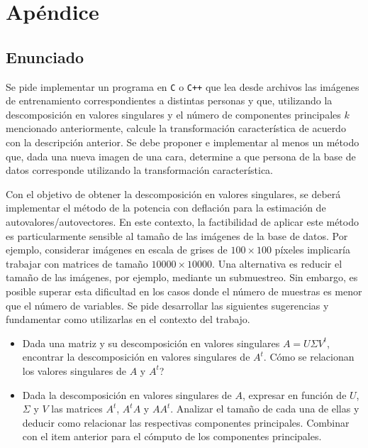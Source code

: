 \section{Ap\'endice}
\subsection{Enunciado}


Se pide implementar un programa en \verb+C+ o \verb-C++- que lea desde archivos las im\'agenes de entrenamiento correspondientes a distintas
personas y que, utilizando la descomposici\'on en valores singulares y el n\'umero de componentes principales $k$
mencionado anteriormente, calcule la transformaci\'on caracter\'istica de acuerdo con la descripci\'on anterior. Se debe
proponer e implementar al menos un m\'etodo que, dada una nueva imagen de una cara, determine a que persona de la base
de datos corresponde utilizando la transformaci\'on caracter\'istica.

Con el objetivo de obtener la descomposici\'on en valores singulares, se deber\'a implementar el m\'etodo de la potencia
con deflaci\'on para la estimaci\'on de autovalores/autovectores. En este contexto, la factibilidad de aplicar este
m\'etodo es particularmente sensible al tama\~no de las im\'agenes de la base de datos. Por ejemplo, considerar im\'agenes
en escala de grises de $100 \times 100$ p\'ixeles implicar\'ia trabajar con matrices de tama\~no $10000 \times
10000$. Una alternativa es reducir el tama\~no de las im\'agenes, por ejemplo, mediante un submuestreo. 
Sin embargo, es posible superar esta dificultad en los casos donde el n\'umero de muestras es menor que el
n\'umero de variables. Se pide desarrollar las siguientes sugerencias y fundamentar como utilizarlas en el contexto del
trabajo.

\begin{itemize}
\item Dada una matriz y su descomposici\'on en valores singulares $A = U \Sigma V^t$, encontrar la descomposici\'on en
valores singulares de $A^t$. C\'omo se relacionan los valores singulares de $A$ y $A^t$?
\item Dada la descomposici\'on en valores singulares de $A$, expresar en funci\'on de $U$, $\Sigma$ y $V$ las matrices
$A^t$, $A^tA$ y $AA^t$. Analizar el tama\~no de cada una de ellas y deducir como relacionar las respectivas componentes
principales.
Combinar con el item anterior para el c\'omputo de los componentes principales.
\end{itemize}

